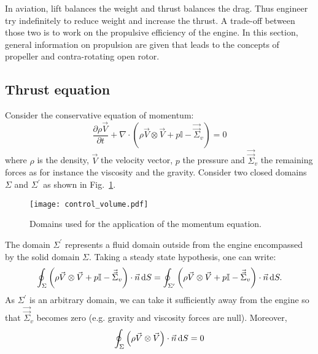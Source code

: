 
In aviation, lift balances the weight and 
thrust balances the drag. Thus engineer try
indefinitely to reduce weight and increase the
thrust. A trade-off between those two is to work
on the propulsive efficiency of the engine. In this
section, general information on propulsion are given
that leads to the concepts of propeller and
contra-rotating open rotor.

\subsection{Thrust equation}
\label{sub:cror_thrust}
Consider the conservative equation of momentum:
\begin{equation}
	\frac{\partial \rho \vec{V}}{\partial t} 
	+ \nabla \cdot (\rho \vec{V} \otimes \vec{V} + p \mathbb{I} - \vec{\vec{\Sigma}}_v) = 0
\end{equation}
where $\rho$ is the density, $\vec{V}$ the velocity vector, $p$ the pressure and
$\vec{\vec{\Sigma}}_v$ the remaining forces as for instance the viscosity and
the gravity.
Consider two closed domains $\Sigma$ and $\Sigma^\prime$ as
shown in Fig.~\ref{fig:cror_control_volume}.
\begin{figure}[htb]
  \centering
  \texttt{[image: control\_volume.pdf]}
  \caption{Domains used for the application of the momentum equation.}
  \label{fig:cror_control_volume}
\end{figure}
The domain $\Sigma^\prime$ represents a fluid domain outside from the
engine encompassed by the solid domain $\Sigma$.
Taking a steady state hypothesis, one can write:
\begin{equation}
	\oint_{\Sigma} \left(\rho \vec{V} \otimes \vec{V} + 
	                       p \mathbb{I} - 
	                       \vec{\vec{\Sigma}}_v \right) \cdot \vec{n} \mathop{}\!\mathrm{d} S
    =
   	\oint_{\Sigma^\prime} \left(\rho \vec{V} \otimes \vec{V} + 
	                       p \mathbb{I} - 
	                       \vec{\vec{\Sigma}}_v \right) \cdot \vec{n} \mathop{}\!\mathrm{d} S.
\end{equation} 
As $\Sigma^\prime$ is an arbitrary domain, we can take it sufficiently
away from the engine so that $\vec{\vec{\Sigma}}_v$ becomes zero (e.g.
gravity and viscosity forces are null).
Moreover, 
\begin{equation}
	\oint_{\Sigma} \left(\rho \vec{V} \otimes \vec{V} \right) \cdot \vec{n} \mathop{}\!\mathrm{d} S = 0
\end{equation}
